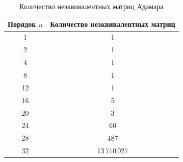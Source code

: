 \documentclass[a4paper,12pt]{article}
\theoremstyle{indented}
\begin{document}

\newpage

\begin{table}[h]
\centering
\caption{Количество неэквивалентных матриц Адамара}
\label{tab:hadamard_counts}
\begin{tabular}{|c|c|}
\hline
\textbf{Порядок $n$} & \textbf{Количество неэквивалентных матриц} \\
\hline
1 & 1 \\
\hline
2 & 1 \\
\hline
4 & 1 \\
\hline
8 & 1 \\
\hline
12 & 1 \\
\hline
16 & 5 \\
\hline
20 & 3 \\
\hline
24 & 60 \\
\hline
28 & 487 \\
\hline
32 & 13\,710\,027 \\
\hline
\end{tabular}
\end{table}

\newpage
\end{document}
